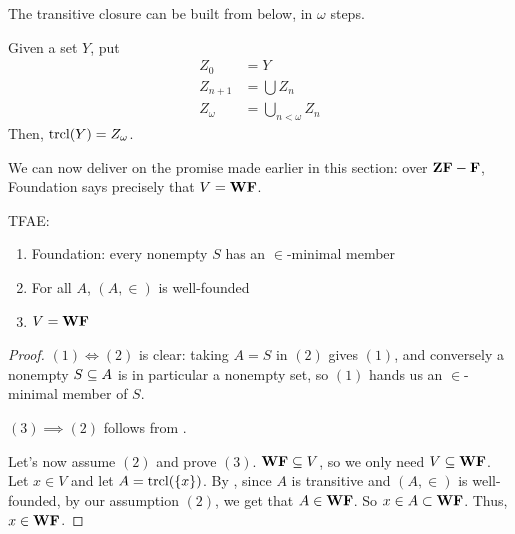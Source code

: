 The transitive closure can be built from below, in $\omega$ steps.

\begin{boxlemma}
    Given a set $Y$, put
    \begin{align*}
        Z_0 &= Y \\
        Z_{n + 1} &= \bigcup Z_n \\
        Z_{\omega} &= \bigcup_{n < \omega} Z_n
    \end{align*}
    Then, $\operatorname{trcl}\!\left( Y \right) = Z_{\omega}$.
\end{boxlemma}

We can now deliver on the promise made earlier in this section: over $\mathbf{ZF} - \mathbf{F}$, Foundation says precisely that $V = \mathbf{WF}$.

\begin{boxproposition}
    TFAE:
    \begin{enumerate}[label = (\arabic*)]
        \item Foundation: every nonempty $S$ has an $\in$-minimal member
        \item For all $A$, $(A, \in)$ is well-founded
        \item $V = \mathbf{WF}$
    \end{enumerate}
\end{boxproposition}
\begin{proof}
    $(1) \iff (2)$ is clear: taking $A = S$ in $(2)$ gives $(1)$, and conversely a nonempty $S \subseteq A$ is in particular a nonempty set, so $(1)$ hands us an $\in$-minimal member of $S$.

    $(3) \implies (2)$ follows from .

    Let's now assume $(2)$ and prove $(3)$. $\mathbf{WF} \subseteq V$, so we only need $V \subseteq \mathbf{WF}$. Let $x \in V$ and let $A = \operatorname{trcl}\!\left( \left\{ x \right\} \right)$.
    By , since $A$ is transitive and $(A, \in)$ is well-founded, by our assumption $(2)$, we get that $A \in \mathbf{WF}$. So $x \in A \subset \mathbf{WF}$. Thus, $x \in \mathbf{WF}$.
\end{proof}
